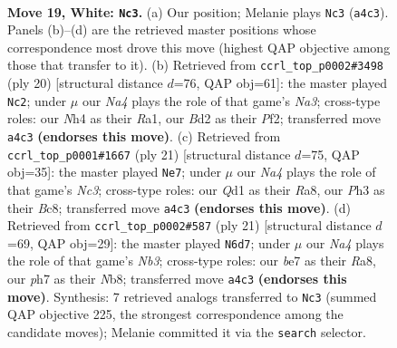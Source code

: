 \documentclass[11pt]{article}
\begin{document}
\begin{figure}[p]
\label{fig:thought-m34}
\end{figure}

\clearpage

\begin{figure}[p]\centering
\begin{subfigure}{0.46\textwidth}\centering
\resizebox{\linewidth}{!}{%
\newchessgame
\chessboard[
  setfen={rn1qr1k1/pp1bbppp/4pn2/2Pp4/N2P3N/P6P/1P1B1PP1/1BRQR1K1 w - - 3 19},
  showmover=false,
  pgfstyle=straightmove, color=movearrow, markmove={a4-c3}
]}
\caption{}
\end{subfigure}\hfill
\begin{subfigure}{0.46\textwidth}\centering
\resizebox{\linewidth}{!}{%
\newchessgame
\chessboard[
  setfen={r1b2rk1/1pq1nppp/p1nbp3/3p4/3P4/N1PB1N1P/PP3PP1/R1BQR1K1 w - - 0 11},
  showmover=false,
  pgfstyle=straightmove, color=movearrow, markmove={a3-c2}
]}
\caption{}
\end{subfigure}
\\[4pt]
\begin{subfigure}{0.46\textwidth}\centering
\resizebox{\linewidth}{!}{%
\newchessgame
\chessboard[
  setfen={r1bq1rk1/bpp2pp1/p1np1n1p/3P4/2P5/2N2NPP/PP3PB1/R1BQ1RK1 b - - 0 11},
  showmover=false,
  pgfstyle=straightmove, color=movearrow, markmove={c6-e7}
]}
\caption{}
\end{subfigure}\hfill
\begin{subfigure}{0.46\textwidth}\centering
\resizebox{\linewidth}{!}{%
\newchessgame
\chessboard[
  setfen={rnbq1rk1/pp2ppbp/1np3p1/P2P4/4P3/2N2N2/1P1B1PPP/2RQKB1R b K - 0 11},
  showmover=false,
  pgfstyle=straightmove, color=movearrow, markmove={b6-d7}
]}
\caption{}
\end{subfigure}
\caption{\textbf{Move 19, White: \texttt{Nc3}.} (a) Our position; Melanie plays \texttt{Nc3} (\texttt{a4c3}). Panels (b)--(d) are the retrieved master positions whose correspondence most drove this move (highest QAP objective among those that transfer to it). (b) Retrieved from \texttt{ccrl\_top\_p0002\#3498} (ply 20) [structural distance $d$=76, QAP obj=61]: the master played \texttt{Nc2}; under $\mu$ our \emph{Na4} plays the role of that game's \emph{Na3}; cross-type roles: our \emph{N}h4 as their \emph{R}a1, our \emph{B}d2 as their \emph{P}f2; transferred move \texttt{a4c3} \textbf{(endorses this move)}. (c) Retrieved from \texttt{ccrl\_top\_p0001\#1667} (ply 21) [structural distance $d$=75, QAP obj=35]: the master played \texttt{Ne7}; under $\mu$ our \emph{Na4} plays the role of that game's \emph{Nc3}; cross-type roles: our \emph{Q}d1 as their \emph{R}a8, our \emph{P}h3 as their \emph{B}c8; transferred move \texttt{a4c3} \textbf{(endorses this move)}. (d) Retrieved from \texttt{ccrl\_top\_p0002\#587} (ply 21) [structural distance $d$=69, QAP obj=29]: the master played \texttt{N6d7}; under $\mu$ our \emph{Na4} plays the role of that game's \emph{Nb3}; cross-type roles: our \emph{b}e7 as their \emph{R}a8, our \emph{p}h7 as their \emph{N}b8; transferred move \texttt{a4c3} \textbf{(endorses this move)}. Synthesis: 7 retrieved analogs transferred to \texttt{Nc3} (summed QAP objective 225, the strongest correspondence among the candidate moves); Melanie committed it via the \texttt{search} selector.}

\end{figure}
\end{document}
